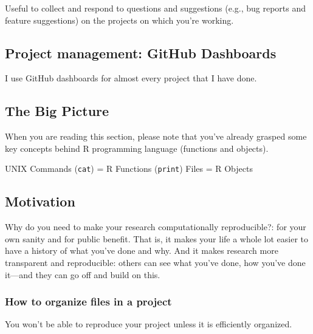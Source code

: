 \documentclass[
  letterpaper,
  DIV=11,
  numbers=noendperiod]{scrreprt}
\begin{document}
Useful to collect and respond to questions and suggestions (e.g., bug
reports and feature suggestions) on the projects on which you're
working.

\hypertarget{project-management-github-dashboards}{%
\subsection*{Project management: GitHub
Dashboards}\label{project-management-github-dashboards}}

I use GitHub dashboards for almost every project that I have done.

\hypertarget{the-big-picture-2}{%
\subsection*{The Big Picture}\label{the-big-picture-2}}

When you are reading this section, please note that you've already
grasped some key concepts behind R programming language (functions and
objects).

UNIX Commands (\texttt{cat}) = R Functions (\texttt{print}) Files = R
Objects

\hypertarget{motivation}{%
\subsection*{Motivation}\label{motivation}}

Why do you need to make your research computationally reproducible?: for
your own sanity and for public benefit. That is, it makes your life a
whole lot easier to have a history of what you've done and why. And it
makes research more transparent and reproducible: others can see what
you've done, how you've done it---and they can go off and build on this.

\hypertarget{how-to-organize-files-in-a-project}{%
\subsubsection*{How to organize files in a
project}\label{how-to-organize-files-in-a-project}}

You won't be able to reproduce your project unless it is efficiently
organized.
\end{document}
